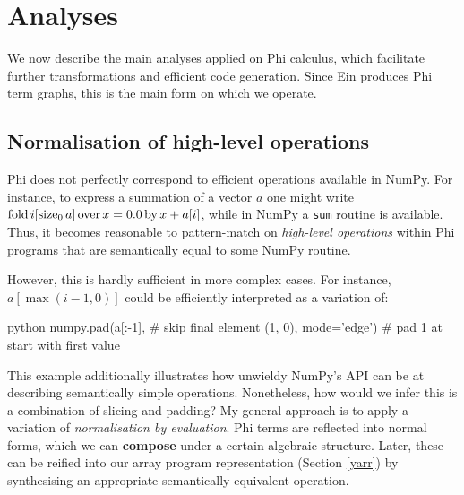 

\section{Analyses}
\label{compiler-analyses}

We now describe the main analyses applied on Phi calculus, which facilitate further transformations and efficient code generation. Since Ein produces Phi term graphs, this is the main form on which we operate.

\subsection{Normalisation of high-level operations}

Phi does not perfectly correspond to efficient operations available in NumPy. For instance, to express a summation of a vector $a$ one might write $\phifold{i}{\phisize{a}{0}}{x}{0.0}{x + a[i]}$, while in NumPy a \texttt{sum} routine is available. Thus, it becomes reasonable to pattern-match on \textit{high-level operations} within Phi programs that are semantically equal to some NumPy routine.

However, this is hardly sufficient in more complex cases. For instance, $a[\max(i - 1, 0)]$ could be efficiently interpreted as a variation of:
\begin{center}
\begin{cminted}{python}
numpy.pad(a[:-1],               # skip final element
          (1, 0), mode='edge')  # pad 1 at start with first value
\end{cminted}
\end{center}
This example additionally illustrates how unwieldy NumPy's API can be at describing semantically simple operations. Nonetheless, how would we infer this is a combination of slicing and padding? My general approach is to apply a variation of \textit{normalisation by evaluation}. Phi terms are reflected into normal forms, which we can \textbf{compose} under a certain algebraic structure. Later, these can be reified into our array program representation (Section \ref{yarr}) by synthesising an appropriate semantically equivalent operation.

